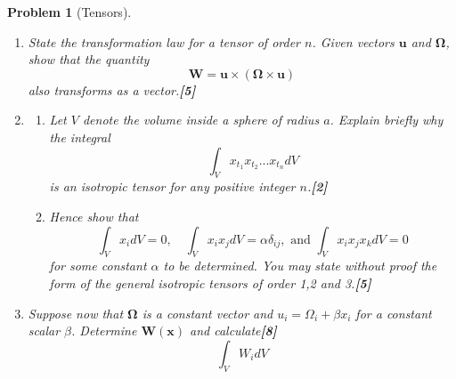 \documentclass[a4paper]{article}
\theoremstyle{new}
\newtheorem{qns}{Problem}[section]
\begin{document}
\newpage
\begin{qns}[Tensors]\leavevmode
\begin{enumerate}[label=(\alph*)]
\item State the transformation law for a tensor of order $n$. Given vectors $\mathbf{u}$ and $\boldsymbol{\Omega}$, show that the quantity
$$\mathbf{W}=\mathbf{u}\times(\boldsymbol{\Omega}\times\mathbf{u})$$
also transforms as a vector.\hfill\textbf{[5]}
\item 
\begin{enumerate}[label=(\roman*)]
\item Let $V$ denote the volume inside a sphere of radius $a$. Explain briefly why the integral
$$\int_Vx_{t_1}x_{t_2}...x_{t_n}dV$$
is an isotropic tensor for any positive integer $n$.\hfill\textbf{[2]}
\item Hence show that
$$\int_Vx_idV=0,\quad\int_Vx_ix_jdV=\alpha\delta_{ij},\text{ and  }\int_Vx_ix_jx_kdV=0$$
for some constant $\alpha$ to be determined. You may state without proof the form of the general isotropic tensors of order 1,2 and 3.\hfill\textbf{[5]}
\end{enumerate}
\item Suppose now that $\boldsymbol{\Omega}$ is a constant vector and $u_i=\Omega_i+\beta x_i$ for a constant scalar $\beta$. Determine $\mathbf{W}(\mathbf{x})$ and calculate\hfill\textbf{[8]}
$$\int_VW_idV$$
\end{enumerate}
\end{qns}
\end{document}
